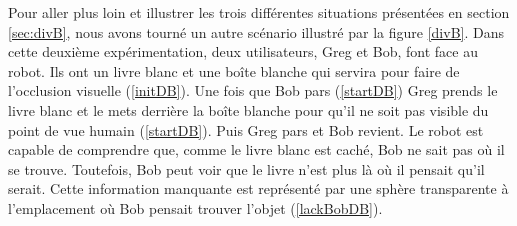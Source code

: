 \documentclass[a4paper,11pt,twoside]{StyleThese}
\begin{document}
Pour aller plus loin et illustrer les trois différentes situations présentées en section \ref{sec:divB}, nous avons tourné un autre scénario illustré par la figure \ref{divB}. Dans cette deuxième expérimentation, deux utilisateurs, Greg et Bob, font face au robot. Ils ont un livre blanc et une boîte blanche qui servira pour faire de l'occlusion visuelle (\ref{initDB}).
Une fois que Bob pars (\ref{startDB}) Greg prends le livre blanc et le mets derrière la boîte blanche pour qu'il ne soit pas visible du point de vue humain (\ref{startDB}).
Puis Greg pars et Bob revient. Le robot est capable de comprendre que, comme le livre blanc est caché, Bob ne sait pas où il se trouve. Toutefois, Bob peut voir que le livre n'est plus là où il pensait qu'il serait. Cette information manquante est représenté par une sphère transparente à l'emplacement où Bob pensait trouver l'objet (\ref{lackBobDB}).
\end{document}
